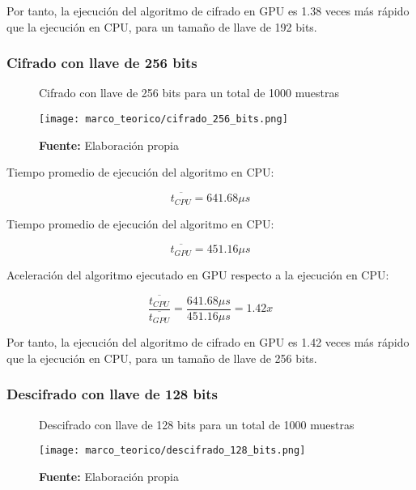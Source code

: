 \documentclass[../main/main.tex]{subfiles}
\begin{document}
        Por tanto, la ejecución del algoritmo de cifrado en GPU es 1.38 veces más rápido que la ejecución en CPU, para un tamaño de llave de 192 bits.

      \subsubsection{Cifrado con llave de 256 bits}

        \begin{figure}[H]
          \centering
          \caption{Cifrado con llave de 256 bits para un total de 1000 muestras}
          \texttt{[image: marco\_teorico/cifrado\_256\_bits.png]}
          \caption*{\textbf{Fuente:} Elaboración propia}
        \end{figure}

        Tiempo promedio de ejecución del algoritmo en CPU:

        \vspace{-0.7cm}\begin{equation}
          \overline{t_{CPU}} = 641.68\mu s
        \end{equation}

        Tiempo promedio de ejecución del algoritmo en CPU:

        \vspace{-0.7cm}\begin{equation}
          \overline{t_{GPU}} = 451.16\mu s
        \end{equation}

        Aceleración del algoritmo ejecutado en GPU respecto a la ejecución en CPU:

        \vspace{-0.7cm}\begin{equation}
          \frac{\overline{t_{CPU}}}{\overline{t_{GPU}}} = \frac{641.68\mu s}{451.16\mu s} = 1.42x
        \end{equation}

        Por tanto, la ejecución del algoritmo de cifrado en GPU es 1.42 veces más rápido que la ejecución en CPU, para un tamaño de llave de 256 bits.

      \subsubsection{Descifrado con llave de 128 bits}

        \begin{figure}[H]
          \centering
          \caption{Descifrado con llave de 128 bits para un total de 1000 muestras}
          \texttt{[image: marco\_teorico/descifrado\_128\_bits.png]}
          \caption*{\textbf{Fuente:} Elaboración propia}
        \end{figure}
\end{document}
